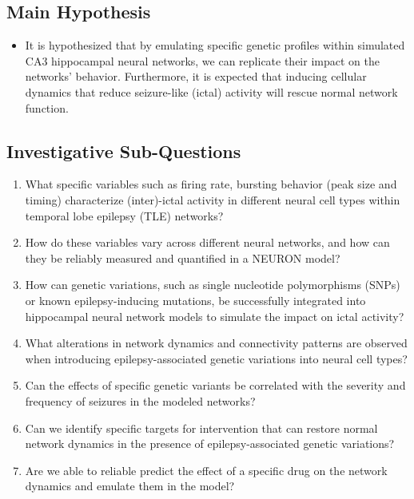\subsection*{Main Hypothesis}

\begin{itemize}
    \item It is hypothesized that by emulating specific genetic profiles within simulated CA3 hippocampal neural networks,
          we can replicate their impact on the networks' behavior. Furthermore, it is expected that inducing cellular dynamics that
          reduce seizure-like (ictal) activity will rescue normal network function.
\end{itemize}

\subsection*{Investigative Sub-Questions}

\begin{enumerate}
    \item What specific variables such as firing rate, bursting behavior (peak size and timing) characterize (inter)-ictal activity in different neural cell types within temporal lobe epilepsy (TLE) networks?
    \item How do these variables vary across different neural networks, and how can they be reliably measured and quantified in a NEURON model?
    \item How can genetic variations, such as single nucleotide polymorphisms (SNPs) or known epilepsy-inducing mutations, be successfully integrated into hippocampal neural network models to simulate the impact on ictal activity?
    \item What alterations in network dynamics and connectivity patterns are observed when introducing epilepsy-associated genetic variations into neural cell types?
    \item Can the effects of specific genetic variants be correlated with the severity and frequency of seizures in the modeled networks?
    \item Can we identify specific targets for intervention that can restore normal network dynamics in the presence of epilepsy-associated genetic variations?
    \item Are we able to reliable predict the effect of a specific drug on the network dynamics and emulate them in the model?
\end{enumerate}